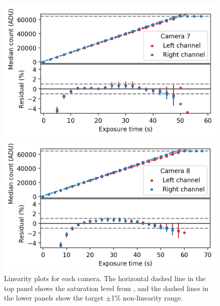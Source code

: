 \begin{colsection}
\begin{figure}[p]
\begin{center}
        \begin{minipage}[t]{0.47\linewidth}\vspace{10pt}
            \includegraphics[width=\linewidth]{images/detectors/lin_7.png}
        \end{minipage}
        \begin{minipage}[t]{0.47\linewidth}\vspace{10pt}
            \includegraphics[width=\linewidth]{images/detectors/lin_8.png}
        \end{minipage}
    \end{center}
    \caption[Linearity plots]{
        Linearity plots for each camera. The horizontal dashed line in the top panel shows the saturation level from , and the dashed lines in the lower panels show the target $\pm$1\% non-linearity range.
    }\label{fig:lin}
\end{figure}

\clearpage
\newpage

\end{colsection}

